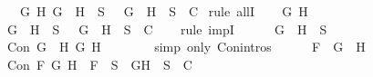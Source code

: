 \begin{isabellebody}
\ \ \ {\isachardoublequoteopen}{\isasymforall}G\ H{\isachardot}\ \isactrlbold {\isasymnot}{\isacharparenleft}G\ \isactrlbold {\isasymor}\ H{\isacharparenright}\ {\isasymin}\ S\ {\isasymlongrightarrow}\ {\isacharbraceleft}\isactrlbold {\isasymnot}\ G{\isacharcomma}\ \isactrlbold {\isasymnot}\ H{\isacharbraceright}\ {\isasymunion}\ S\ {\isasymin}\ C{\isachardoublequoteclose}\isanewline
%
\isadelimproof
%
\endisadelimproof
%
\isatagproof
{}\isamarkupfalse%
\ {\isacharparenleft}rule\ allI{\isacharparenright}{\isacharplus}\isanewline
\ \ \isamarkupfalse%
\ G\ H\isanewline
\ \ \isamarkupfalse%
\ {\isachardoublequoteopen}\isactrlbold {\isasymnot}{\isacharparenleft}G\ \isactrlbold {\isasymor}\ H{\isacharparenright}\ {\isasymin}\ S\ {\isasymlongrightarrow}\ {\isacharbraceleft}\isactrlbold {\isasymnot}\ G{\isacharcomma}\ \isactrlbold {\isasymnot}\ H{\isacharbraceright}\ {\isasymunion}\ S\ {\isasymin}\ C{\isachardoublequoteclose}\isanewline
\ \ \isamarkupfalse%
\ {\isacharparenleft}rule\ impI{\isacharparenright}\isanewline
\ \ \ \ \isamarkupfalse%
\ {\isachardoublequoteopen}\isactrlbold {\isasymnot}{\isacharparenleft}G\ \isactrlbold {\isasymor}\ H{\isacharparenright}\ {\isasymin}\ S{\isachardoublequoteclose}\isanewline
\ \ \ \ \isamarkupfalse%
\ \isamarkupfalse%
\ {\isachardoublequoteopen}Con\ {\isacharparenleft}\isactrlbold {\isasymnot}{\isacharparenleft}G\ \isactrlbold {\isasymor}\ H{\isacharparenright}{\isacharparenright}\ {\isacharparenleft}\isactrlbold {\isasymnot}G{\isacharparenright}\ {\isacharparenleft}\isactrlbold {\isasymnot}H{\isacharparenright}{\isachardoublequoteclose}\isanewline
\ \ \ \ \ \ \isamarkupfalse%
\ {\isacharparenleft}simp\ only{\isacharcolon}\ Con{\isachardot}intros{\isacharparenleft}{}{\isacharparenright}{\isacharparenright}\isanewline
\ \ \ \ \isamarkupfalse%
\ {\isacharquery}F\ {\isacharequal}\ {\isachardoublequoteopen}\isactrlbold {\isasymnot}{\isacharparenleft}G\ \isactrlbold {\isasymor}\ H{\isacharparenright}{\isachardoublequoteclose}\isanewline
\ \ \ \ \isamarkupfalse%
\ {\isachardoublequoteopen}Con\ {\isacharquery}F\ {\isacharparenleft}\isactrlbold {\isasymnot}G{\isacharparenright}\ {\isacharparenleft}\isactrlbold {\isasymnot}H{\isacharparenright}\ {\isasymlongrightarrow}\ {\isacharquery}F\ {\isasymin}\ S\ {\isasymlongrightarrow}\ {\isacharbraceleft}\isactrlbold {\isasymnot}G{\isacharcomma}\isactrlbold {\isasymnot}H{\isacharbraceright}\ {\isasymunion}\ S\ {\isasymin}\ C{\isachardoublequoteclose}\isanewline

\end{isabellebody}
